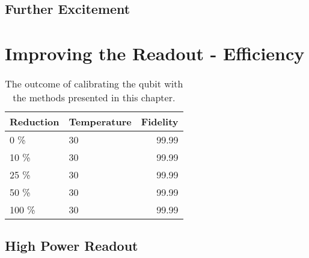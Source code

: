 \subsection{Further Excitement}

\section{Improving the Readout - Efficiency}


\begin{table}[h]
\centering
\caption{The outcome of calibrating the qubit with the methods presented in this chapter.}
\begin{tabular}{ll|r}
\hline
\textbf{Reduction}        & Temperature                  & Fidelity\\ \hline
0   \%                      &  30                        &  99.99\\
10  \%                     &  30                         &  99.99\\
25  \%                     &  30                         &  99.99\\
50  \%                     &  30                         &  99.99\\
100 \%                     &  30                         &  99.99\\
\end{tabular}
\label{tab:readout_infidelity_contribution_estimation}
\end{table}



\subsection{High Power Readout}


